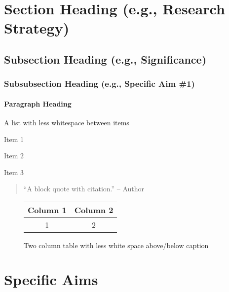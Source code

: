 \documentclass[11pt,notitlepage]{article}
\begin{document}
\section*{Section Heading (e.g., Research Strategy)}

\subsection*{Subsection Heading (e.g., Significance)}

\blindtext

\subsubsection*{Subsubsection Heading (e.g., Specific Aim \#1)}

\blindtext

\paragraph{Paragraph Heading}
\blindtext

A list with less whitespace between items

\begin{itemize*}
	\item Item 1
	\item Item 2
	\item Item 3
\end{itemize*}

\begin{quote}
	``A block quote with citation.'' -- Author~\cite{reference1}
\end{quote}

\begin{figure}[htbp]
\begin{center}

\begin{tabular}{|c|c|}

\hline
Column 1 & Column 2 \\
\hline 
1 & 2 \\
\hline

\end{tabular}

\caption{Two column table with less white space above/below caption}
\label{default}
\end{center}
\end{figure}


\newpage

\section*{Specific Aims}
\end{document}
